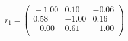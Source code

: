 \documentclass[10pt,a4paper]{article}
\begin{document}
 \begin{equation*} r_1  =  %
\begin{pmatrix}{}
  -1.00 & 0.10 & -0.06 \\ 
  0.58 & -1.00 & 0.16 \\ 
  -0.00 & 0.61 & -1.00 \\ 
  \end{pmatrix}
 \end{equation*} 
\end{document}
